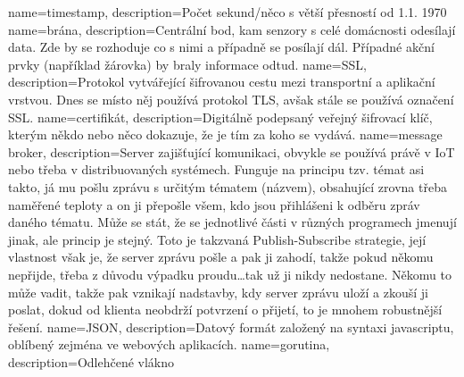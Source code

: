 {
  name={timestamp},
  description={Počet sekund/něco s větší přesností od 1.1. 1970}
}
{
  name={brána},
  description={Centrální bod, kam senzory s celé domácnosti odesílají data. Zde by se rozhoduje co s nimi a případně se 
  posílají dál. Případné akční prvky (například žárovka) by braly informace odtud.}
}
{
  name={SSL},
  description={Protokol vytvářející šifrovanou cestu mezi transportní a aplikační vrstvou. Dnes se místo něj používá 
protokol TLS, avšak stále se používá označení SSL.}
}
{
  name={certifikát},
  description={Digitálně podepsaný veřejný šifrovací klíč, kterým někdo nebo něco dokazuje, že je tím za koho se 
vydává.}
}
{
  name={message broker},
  description={Server zajišťující komunikaci, obvykle se používá právě v IoT nebo třeba v distribuovaných systémech. 
Funguje na principu tzv. témat asi takto, já mu pošlu zprávu s určitým tématem (názvem), obsahující zrovna třeba 
naměřené teploty a on ji přepošle všem, kdo jsou přihlášeni k odběru zpráv daného tématu. Může se stát, že se jednotlivé 
části v různých programech jmenují jinak, ale princip je stejný. Toto je takzvaná Publish-Subscribe strategie, její 
vlastnost však je, že server zprávu pošle a pak ji zahodí, takže pokud někomu nepřijde, třeba z důvodu výpadku 
proudu\ldots tak už ji nikdy nedostane. Někomu to může vadit, takže pak vznikají nadstavby, kdy server zprávu uloží 
a zkouší ji poslat, dokud od klienta neobdrží potvrzení o přijetí, to je mnohem robustnější řešení.}
}
{
  name={JSON},
  description={Datový formát založený na syntaxi javascriptu, oblíbený zejména ve webových aplikacích.}
}
{
  name={gorutina},
  description={Odlehčené vlákno}
}

